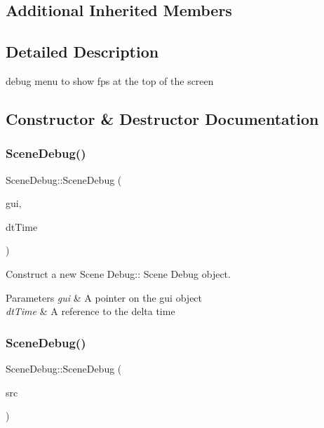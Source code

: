 \subsection*{Additional Inherited Members}


\subsection{Detailed Description}
debug menu to show fps at the top of the screen 

\subsection{Constructor \& Destructor Documentation}
\mbox{\label{class_scene_debug_a92210a0cef4f3fe86526378a8b27492c}} 
\subsubsection{\texorpdfstring{Scene\+Debug()}{SceneDebug()}\hspace{0.1cm}{\footnotesize\ttfamily [1/2]}}
{\footnotesize\ttfamily Scene\+Debug\+::\+Scene\+Debug (\begin{DoxyParamCaption}\item[{\hyperlink{class_gui}{Gui} $\ast$}]{gui,  }\item[{float const \&}]{dt\+Time }\end{DoxyParamCaption})}



Construct a new Scene Debug\+:\+: Scene Debug object. 


\begin{DoxyParams}{Parameters}
{\em gui} & A pointer on the gui object \\
\hline
{\em dt\+Time} & A reference to the delta time \\
\hline
\end{DoxyParams}
\mbox{\label{class_scene_debug_a58950a1b730cea99216ae3c27d1e7d11}} 
\subsubsection{\texorpdfstring{Scene\+Debug()}{SceneDebug()}\hspace{0.1cm}{\footnotesize\ttfamily [2/2]}}
{\footnotesize\ttfamily Scene\+Debug\+::\+Scene\+Debug (\begin{DoxyParamCaption}\item[{\hyperlink{class_scene_debug}{Scene\+Debug} const \&}]{src }\end{DoxyParamCaption})}



